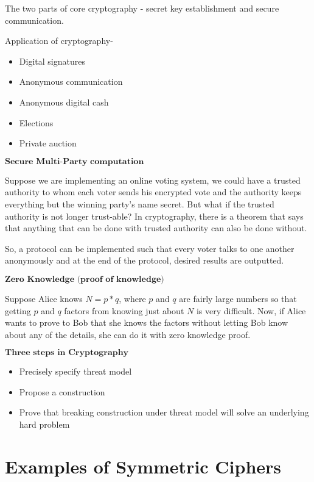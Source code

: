 \documentclass[a4paper, 12pt]{article}
\begin{document}
The two parts of core cryptography - secret key establishment and secure communication.

\noindent
Application of cryptography-

\begin{itemize}
    \item Digital signatures
    \item Anonymous communication
    \item Anonymous digital cash
    \item Elections
    \item Private auction
\end{itemize}

\noindent
$\textbf{Secure Multi-Party computation}$

Suppose we are implementing an online voting system, we could have a trusted authority to whom each voter sends his encrypted vote and the authority keeps everything but the winning party's name secret. But what if the trusted authority is not longer trust-able? In cryptography, there is a theorem that says that anything that can be done with trusted authority can also be done without.

So, a protocol can be implemented such that every voter talks to one another anonymously and at the end of the protocol, desired results are outputted.

\noindent
$\textbf{Zero Knowledge (proof of knowledge)}$

Suppose Alice knows $N=p*q$, where $p$ and $q$ are fairly large numbers so that getting $p$ and $q$ factors from knowing just about $N$ is very difficult. Now, if Alice wants to prove to Bob that she knows the factors without letting Bob know about any of the details, she can do it with zero knowledge proof.

\noindent
$\textbf{Three steps in Cryptography}$

\begin{itemize}
    \item Precisely specify threat model
    \item Propose a construction
    \item Prove that breaking construction under threat model will solve an underlying hard problem
\end{itemize}

\section{Examples of Symmetric Ciphers}
\end{document}
